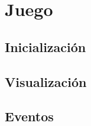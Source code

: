 \documentclass[parskip=half*]{scrartcl}
\begin{document}
\newpage
\section{Juego}
	\subsection{Inicializaci\'on}

	\subsection{Visualizaci\'on}

	\subsection{Eventos}

\end{document}
